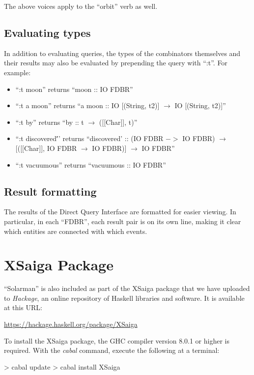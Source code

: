 \documentclass[../main.tex]{subfiles}
\begin{document}
The above voices apply to the ``orbit'' verb as well.

\subsection{Evaluating types}

In addition to evaluating queries, the types of the combinators themselves and their results may also be evaluated by prepending the query with
``:t''.  For example:

\begin{itemize}
	\item ``:t moon'' returns ``moon :: IO FDBR''
	\item ``:t a moon'' returns ``a moon :: IO [(String,  t2)] $\rightarrow$ IO [(String,  t2)]''
	\item ``:t by'' returns ``by :: t $\rightarrow$ ([[Char]],  t)''
	\item ``:t discovered\''' returns ``discovered'	:: (IO FDBR $->$ IO FDBR) $\rightarrow$ [([[Char]],  IO FDBR $\rightarrow$ IO FDBR)] $\rightarrow$ IO FDBR''
	\item ``:t vacuumous'' returns ``vacuumous :: IO FDBR''
\end{itemize}

\subsection{Result formatting}

The results of the Direct Query Interface are formatted for easier viewing.  In particular, in each ``FDBR'', each result pair is on its own line, making
it clear which entities are connected with which events.

\section{XSaiga Package}

``Solarman'' is also included as part of the XSaiga package that we have uploaded to {\em Hackage}, an online repository of Haskell libraries and software\cite{XSaiga:2016}.
It is available at this URL:

\url{https://hackage.haskell.org/package/XSaiga}

To install the XSaiga package, the GHC compiler version 8.0.1 or higher is required.  With the {\em cabal} command, execute the following at a terminal:

\begin{code}
	> cabal update
	> cabal install XSaiga
\end{code}
\end{document}
